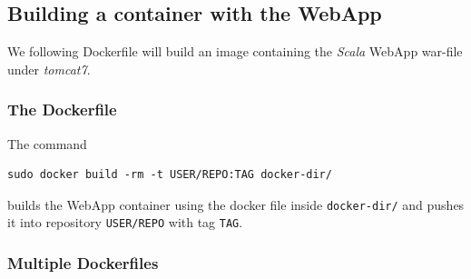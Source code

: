 \documentclass[captions=tableheading]{article}
\begin{document}
\subsection{Building a container with the WebApp}
\label{sec-4-5}

We following Dockerfile will build an image containing the \emph{Scala} WebApp war-file under \emph{tomcat7}.
\subsubsection{The Dockerfile}
\label{sec-4-5-1}

The command 

\begin{verbatim}
sudo docker build -rm -t USER/REPO:TAG docker-dir/
\end{verbatim}
builds the WebApp container using the docker file inside \texttt{docker-dir/} and pushes it into repository \texttt{USER/REPO} with tag \texttt{TAG}. 
\subsubsection{Multiple  Dockerfiles}
\label{sec-4-5-2}
\end{document}
